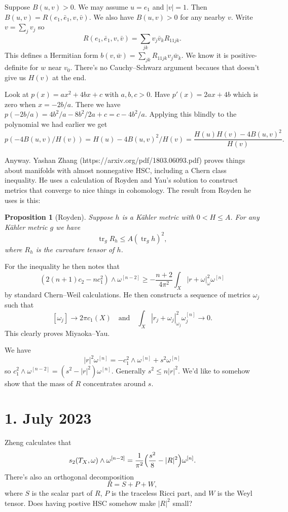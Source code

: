 \documentclass[11pt]{article}
\newtheorem{prop}[theo]{Proposition}
\theoremstyle{definition}
\def\^#1{^{[#1]}}
\def\qandq{\quad\text{and}\quad}
\DeclareMathOperator{\tr}{tr}
\begin{document}
Suppose $B(u,v) > 0$.
We may assume $u = e_1$ and $|v| = 1$.
Then
$
B(u,v) = R(e_1, \bar e_1, v, \bar v)
$.
We also have $B(u,v) > 0$ for any nearby $v$.
Write $v = \sum_j v_j$ so
$$
R(e_1, \bar e_1, v, \bar v)
= \sum_{jk} v_j \bar v_k R_{11jk}.
$$
This defines a Hermitian form $b(v,\bar w) = \sum_{jk} R_{11jk} v_j \bar w_k$.
We know it is positive-definite for $w$ near $v_0$.
There's no Cauchy--Schwarz argument becaues that doesn't give us $H(v)$ at the end.

Look at $p(x) = ax^2 + 4bx + c$ with $a,b,c > 0$.
Have $p'(x) = 2ax + 4b$ which is zero when $x = - 2b / a$.
There we have
$p(-2b/a) = 4b^2/a - 8b^2 / 2a + c = c - 4b^2 / a$.
Applying this blindly to the polynomial we had earlier we get
$$
p(-4B(u,v)/H(v))
= H(u) - 4 B(u,v)^2 / H(v)
= \frac{H(u)H(v) - 4B(u,v)^2}{H(v)}.
$$


Anyway.
Yashan Zhang (https://arxiv.org/pdf/1803.06093.pdf) proves things
about manifolds with almost nonnegative HSC, including a Chern class inequality.
He uses a calculation of Royden and Yau's solution to construct metrics that
converge to nice things in cohomology.
The result from Royden he uses is this:

\begin{prop}[Royden]
Suppose $h$ is a K\"ahler metric with $0 < H \leq A$.
For any K\"ahler metric $g$ we have
$$
\tr_g R_h \leq A (\tr_g h)^2,
$$
where $R_h$ is the curvature tensor of $h$.
\end{prop}

For the inequality he then notes that
$$
(2(n+1)c_2 - n c_1^2) \wedge \omega\^{n-2}
\geq - \frac{n+2}{4\pi^2} \int_X | r + \omega |^2_\omega \omega\^n
$$
by standard Chern--Weil calculations.
He then constructs a sequence of metrics $\omega_j$ such that
$$
[\omega_{j}] \to 2 \pi c_1(X)
\qandq
\int_X |r_j + \omega_j|^2_{\omega_j} \omega_j\^n \to 0.
$$
This clearly proves Miyaoka--Yau.

We have
$$
|r|^2 \omega\^n
= - c_1^2 \wedge \omega\^n
+ s^2 \omega\^n
$$
so $c_1^2 \wedge \omega\^{n-2} = (s^2 - |r|^2) \omega\^n$.
Generally $s^2 \leq n |r|^2$.
We'd like to somehow show that the mass of $R$ concentrates around $s$.


\section{1. July 2023}

Zheng calculates that
$$
s_2(T_X,\omega) \wedge \omega\^{n-2}
= \frac{1}{\pi^2} \Bigl(
\frac{s^2}{8} - |R|^2
\Bigr) \omega\^n.
$$
There's also an orthogonal decomposition
$$
R = S + P + W,
$$
where $S$ is the scalar part of $R$, $P$ is the traceless Ricci part, and
$W$ is the Weyl tensor.
Does having postive HSC somehow make $|R|^2$ small?
\end{document}
